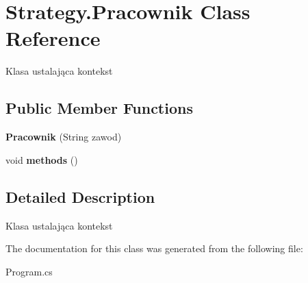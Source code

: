 \hypertarget{class_strategy_1_1_pracownik}{}\section{Strategy.\+Pracownik Class Reference}
\label{class_strategy_1_1_pracownik}


Klasa ustalająca kontekst  


\subsection*{Public Member Functions}
\begin{DoxyCompactItemize}
\item 
\mbox{\label{class_strategy_1_1_pracownik_a93cd66843cd697fbeadec67a60097017}} 
{\bfseries Pracownik} (String zawod)
\item 
\mbox{\label{class_strategy_1_1_pracownik_a38d8b6963c1af45086fd33ebbe259611}} 
void {\bfseries methods} ()
\end{DoxyCompactItemize}


\subsection{Detailed Description}
Klasa ustalająca kontekst 



The documentation for this class was generated from the following file\+:\begin{DoxyCompactItemize}
\item 
Program.\+cs\end{DoxyCompactItemize}
